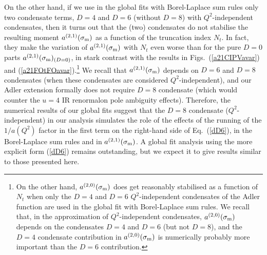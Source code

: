 \documentclass[aps,nofootinbib,showkeys,noshowpacs,preprintnumbers,amsmath,amssymb]{revtex4}
\newcommand{\sm}{{\sigma_{\rm m}}}
\begin{document}
On the other hand, if we use in the global fits with Borel-Laplace sum rules only two condensate terms, $D=4$ and $D=6$ (without $D=8$) with $Q^2$-independent condensates, then it turns out that the (two) condensates do not stabilise the resulting moment $a^{(2,1)}(\sm)$ as a function of the truncation index $N_t$. In fact, they make the variation of $a^{(2,1)}(\sm)$ with $N_t$ even worse than for the pure $D=0$ parts $a^{(2,1)}(\sm)_{(D=0)}$, in stark contrast with the results in Figs.~(\ref{a21CIPVavar}) and (\ref{a21FOtFOavar}).\footnote{On the other hand, $a^{(2,0)}(\sm)$ does get reasonably stabilised as a function of $N_t$ when only the $D=4$ and $D=6$ $Q^2$-independent condensates of the Adler function are used in the global fit with Borel-Laplace sum rules. We recall that, in the approximation of $Q^2$-independent condensates, $a^{(2,0)}(\sm)$ depends on the condensates $D=4$ and $D=6$ (but not $D=8$), and the $D=4$ condensate contribution in $a^{(2,0)}(\sm)$ is numerically probably more important than the $D=6$ contribution.}  We recall that $a^{(2,1)}(\sm)$ depends on $D=6$ and $D=8$ condensates (when these condensates are considered $Q^2$-independent), and our Adler extension formally does not require $D=8$ condensate (which would counter the $u=4$ IR renormalon pole ambiguity effects). Therefore, the numerical results of our global fits suggest that the $D=8$ condensate ($Q^2$-independent) in our analysis simulates the role of the effects of the running of the $1/a(Q^2)$ factor in the first term on the right-hand side of Eq.~(\ref{dD6}), in the Borel-Laplace sum rules and in $a^{(2,1)}(\sm)$. A global fit analysis using the more explicit form (\ref{dD6}) remains outstanding, but we expect it to give results similar to those presented here.
\end{document}
